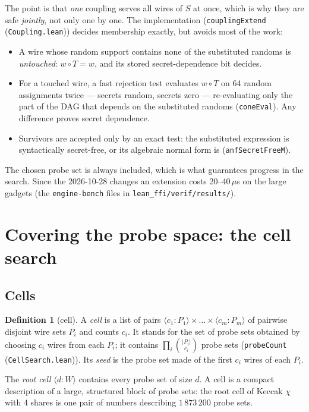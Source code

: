 \documentclass[11pt,a4paper]{article}
\theoremstyle{definition}
\newtheorem{definition}[theorem]{Definition}
\theoremstyle{remark}
\newcommand{\code}[1]{\texttt{\small #1}}
\newcommand{\lean}[2]{\code{#1}\,(\code{#2})}
\newcommand{\cellof}[2]{\langle #1 \mathbin{:} #2\rangle}
\begin{document}
The point is that \emph{one} coupling serves all wires of $S$ at once, which is why they
are safe \emph{jointly}, not only one by one.  The implementation
(\lean{couplingExtend}{Coupling.lean}) decides membership exactly, but avoids most of the
work:
\begin{itemize}[leftmargin=*]
\item A wire whose random support contains none of the substituted randoms is
  \emph{untouched}: $w\circ T = w$, and its stored secret-dependence bit decides.
\item For a touched wire, a fast rejection test evaluates $w\circ T$ on 64 random
  assignments twice --- secrets random, secrets zero --- re-evaluating only the part of the
  DAG that depends on the substituted randoms (\code{coneEval}).  Any difference proves
  secret dependence.
\item Survivors are accepted only by an exact test: the substituted expression is
  syntactically secret-free, or its algebraic normal form is (\code{anfSecretFreeM}).
\end{itemize}
The chosen probe set is always included, which is what guarantees progress in the search.
Since the 2026-10-28 changes an extension costs 20--40\,$\mu$s on the large gadgets
(the \code{engine-bench} files in \code{lean\_ffi/verif/results/}).

\section{Covering the probe space: the cell search}\label{sec:cells}

\subsection{Cells}

\begin{definition}[cell]
A \emph{cell} is a list of pairs $\cellof{c_1}{P_1}\times\dots\times\cellof{c_m}{P_m}$ of
pairwise disjoint wire sets $P_i$ and counts $c_i$.  It stands for the set of probe sets
obtained by choosing $c_i$ wires from each $P_i$; it contains
$\prod_i\binom{|P_i|}{c_i}$ probe sets (\lean{probeCount}{CellSearch.lean}).  Its
\emph{seed} is the probe set made of the first $c_i$ wires of each $P_i$.
\end{definition}

The \emph{root cell} $\cellof{d}{W}$ contains every probe set of size $d$.  A cell is a
compact description of a large, structured block of probe sets: the root cell of Keccak
$\chi$ with 4 shares is one pair of numbers describing $1\,873\,200$ probe sets.
\end{document}

